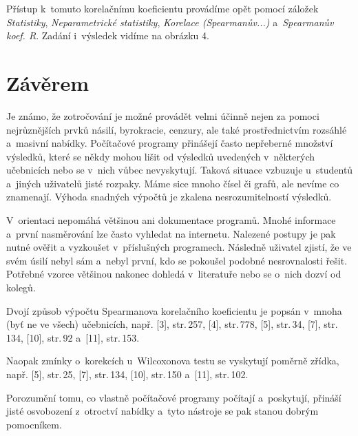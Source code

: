 Přístup k~tomuto korelačnímu koeficientu provádíme opět pomocí záložek
{\it Statistiky}, {\it Neparametrické statistiky}, {\it Korelace (Spearmanův...)} a~{\it S\b{p}earmanův koef. R}. Zadání i~výsledek vidíme na obrázku 4.


\newpage
\section*{Závěrem}

Je známo, že zotročování je možné provádět velmi účinně nejen za pomoci nejrůznějších prvků násilí, byrokracie, cenzury, 
ale také prostřednictvím rozsáhlé a~masivní nabídky.
Počítačové programy přinášejí často nepřeberné množství výsledků, které se někdy mohou lišit od výsledků uvedených v~některých
učebnicích nebo se v~nich vůbec nevyskytují.
Taková situace vzbuzuje u~studentů a~jiných uživatelů jisté rozpaky. Máme sice mnoho čísel či grafů, ale nevíme co znamenají. Výhoda snadných výpočtů je zkalena nesrozumitelností výsledků.

V~orientaci nepomáhá většinou ani dokumentace programů. Mnohé informace a~první nasměrování lze často vyhledat na internetu. Nalezené postupy je pak nutné 
ověřit a vyzkoušet v~příslušných programech. Následně uživatel zjistí, že ve svém úsilí nebyl sám a~nebyl první, kdo se
pokoušel podobné nesrovnalosti řešit. Potřebné vzorce většinou nakonec dohledá v~literatuře nebo se o~nich dozví od kolegů. 

Dvojí způsob výpočtu Spearmanova korelačního koeficientu je
popsán v~mnoha (byť ne ve všech) učebnicích, např. 
[3], str.\,257, 
[4], str.\,778, 
[5], str.\,34, 
[7], str.\,134, 
[10], str.\,92 
a~[11], str.\,153.

Naopak zmínky o~korekcích u~Wilcoxonova testu se vyskytují poměrně zřídka, např. 
[5], str.\,25, 
[7], str.\,134, 
[10], str.\,150 
a~[11], str.\,102.

Porozumění tomu, co vlastně počítačové programy počítají a~poskytují, přináší jisté osvobození z~otroctví nabídky a~tyto
nástroje se pak stanou dobrým pomocníkem.


